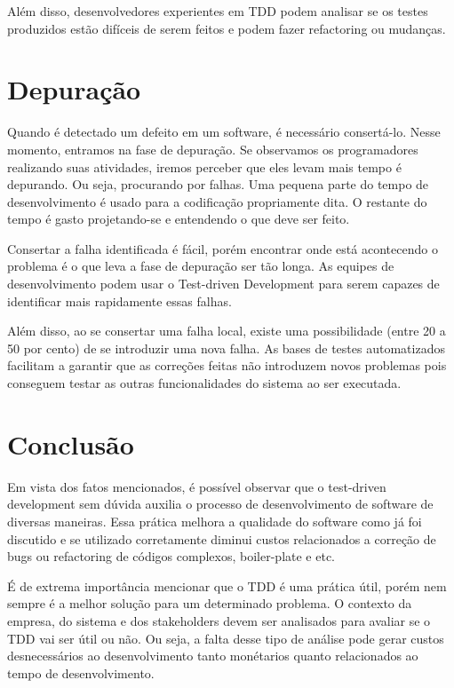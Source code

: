 \documentclass[12pt]{article}
\begin{document}
  Além disso, desenvolvedores experientes em TDD podem analisar se os testes 
  produzidos estão difíceis de serem feitos e podem fazer refactoring ou 
  mudanças.

  \section{Depuração}

  Quando é detectado um defeito em um software, é necessário consertá-lo. Nesse
  momento, entramos na fase de depuração. Se observamos os programadores 
  realizando suas atividades, iremos perceber que eles levam mais tempo é 
  depurando. Ou seja, procurando por falhas.
  Uma pequena parte do tempo de desenvolvimento é usado para a 
  codificação propriamente dita. O 
  restante do tempo é gasto projetando-se e entendendo o que deve ser feito.

  Consertar a falha identificada é fácil, porém encontrar onde está acontecendo
  o problema é o que leva a fase de depuração ser tão longa. As equipes de 
  desenvolvimento podem usar o Test-driven Development para serem capazes de
  identificar mais rapidamente essas falhas.

  Além disso, ao se consertar uma falha local, existe uma possibilidade (entre
  20 a 50 por cento) de se introduzir uma nova falha. As bases de testes 
  automatizados facilitam a garantir que as correções feitas não introduzem 
  novos problemas pois conseguem testar as outras funcionalidades do sistema
  ao ser executada.

  \section{Conclusão}

  Em vista dos fatos mencionados, é possível observar que o test-driven development 
  sem dúvida auxilia o processo de desenvolvimento de software de diversas
  maneiras. Essa prática melhora a qualidade do software como já foi discutido
  e se utilizado corretamente diminui custos relacionados a correção de bugs 
  ou refactoring de códigos complexos, boiler-plate e etc.

  É de extrema importância mencionar que o TDD é uma prática útil, porém nem 
  sempre é a melhor solução para um determinado problema. O contexto da empresa, 
  do sistema e dos stakeholders devem ser analisados para avaliar se o TDD vai 
  ser útil ou não. Ou seja, a falta desse tipo de análise pode gerar custos 
  desnecessários ao desenvolvimento tanto monétarios quanto relacionados ao 
  tempo de desenvolvimento.
  \clearpage
\end{document}
